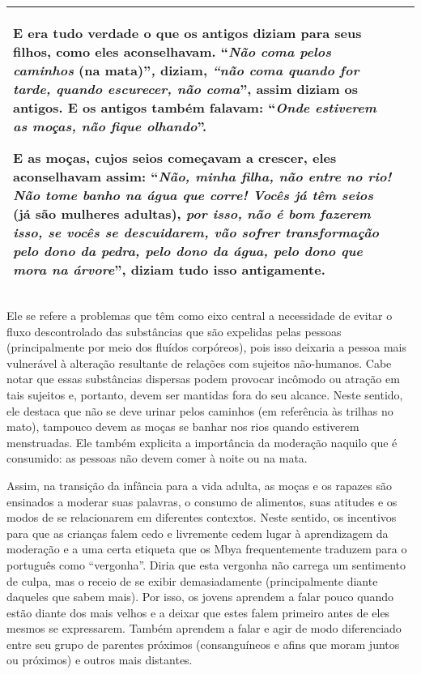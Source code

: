 \begin{longtable}[]{@{}ll@{}}
\begin{minipage}[t]{0.48\columnwidth}
E era tudo verdade o que os antigos diziam para seus filhos, como eles
aconselhavam. ``\emph{Não coma pelos caminhos} (na mata)''\emph{,}
diziam, \emph{``não coma quando for tarde, quando escurecer, não
coma}'', assim diziam os antigos. E os antigos também falavam:
``\emph{Onde estiverem as moças, não fique olhando}''.

E as moças, cujos seios começavam a crescer, eles aconselhavam assim:
``\emph{Não, minha filha, não entre no rio! Não tome banho na água que
corre! Vocês já têm seios} (já são mulheres adultas), \emph{por isso,}
\emph{não é bom fazerem isso, se vocês se descuidarem, vão sofrer
transformação pelo dono da pedra, pelo dono da água, pelo dono que mora
na árvore}'', diziam tudo isso antigamente.\strut
\end{minipage}\tabularnewline
\bottomrule
\end{longtable}

Ele se refere a problemas que têm como eixo central a necessidade de
evitar o fluxo descontrolado das substâncias que são expelidas pelas
pessoas (principalmente por meio dos fluídos corpóreos), pois isso
deixaria a pessoa mais vulnerável à alteração resultante de relações com
sujeitos não-humanos. Cabe notar que essas substâncias dispersas podem
provocar incômodo ou atração em tais sujeitos e, portanto, devem ser
mantidas fora do seu alcance. Neste sentido, ele destaca que não se deve
urinar pelos caminhos (em referência às trilhas no mato), tampouco devem
as moças se banhar nos rios quando estiverem menstruadas. Ele também
explicita a importância da moderação naquilo que é consumido: as pessoas
não devem comer à noite ou na mata.

Assim, na transição da infância para a vida adulta, as moças e os
rapazes são ensinados a moderar suas palavras, o consumo de alimentos,
suas atitudes e os modos de se relacionarem em diferentes contextos.
Neste sentido, os incentivos para que as crianças falem cedo e
livremente cedem lugar à aprendizagem da moderação e a uma certa
etiqueta que os Mbya frequentemente traduzem para o português como
``vergonha''. Diria que esta vergonha não carrega um sentimento de
culpa, mas o receio de se exibir demasiadamente (principalmente diante
daqueles que sabem mais). Por isso, os jovens aprendem a falar pouco
quando estão diante dos mais velhos e a deixar que estes falem primeiro
antes de eles mesmos se expressarem. Também aprendem a falar e agir de
modo diferenciado entre seu grupo de parentes próximos (consanguíneos e
afins que moram juntos ou próximos) e outros mais distantes.

